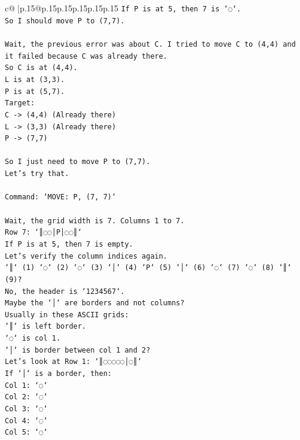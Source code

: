 \documentclass{article}
\begin{document}
{\begin{supertabular}{c@{$\;$}|p{.15\linewidth}@{}p{.15\linewidth}p{.15\linewidth}p{.15\linewidth}p{.15\linewidth}p{.15\linewidth}}
{{{\texttt{If P is at 5, then 7 is `◌`.} \\
\texttt{So I should move P to (7,7).} \\
\\ 
\texttt{Wait, the previous error was about C. I tried to move C to (4,4) and it failed because C was already there.} \\
\texttt{So C is at (4,4).} \\
\texttt{L is at (3,3).} \\
\texttt{P is at (5,7).} \\
\texttt{Target:} \\
\texttt{C {-}> (4,4) (Already there)} \\
\texttt{L {-}> (3,3) (Already there)} \\
\texttt{P {-}> (7,7)} \\
\\ 
\texttt{So I just need to move P to (7,7).} \\
\texttt{Let's try that.} \\
\\ 
\texttt{Command: `MOVE: P, (7, 7)`} \\
\\ 
\texttt{Wait, the grid width is 7. Columns 1 to 7.} \\
\texttt{Row 7: `║◌◌│P│◌◌║`} \\
\texttt{If P is at 5, then 7 is empty.} \\
\texttt{Let's verify the column indices again.} \\
\texttt{`║` (1) `◌` (2) `◌` (3) `│` (4) `P` (5) `│` (6) `◌` (7) `◌` (8) `║` (9)?} \\
\texttt{No, the header is `1234567`.} \\
\texttt{Maybe the `│` are borders and not columns?} \\
\texttt{Usually in these ASCII grids:} \\
\texttt{`║` is left border.} \\
\texttt{`◌` is col 1.} \\
\texttt{`│` is border between col 1 and 2?} \\
\texttt{Let's look at Row 1: `║◌◌◌◌◌│◌║`} \\
\texttt{If `│` is a border, then:} \\
\texttt{Col 1: `◌`} \\
\texttt{Col 2: `◌`} \\
\texttt{Col 3: `◌`} \\
\texttt{Col 4: `◌`} \\
\texttt{Col 5: `◌`} \\
}}}
\end{supertabular}}
\end{document}
